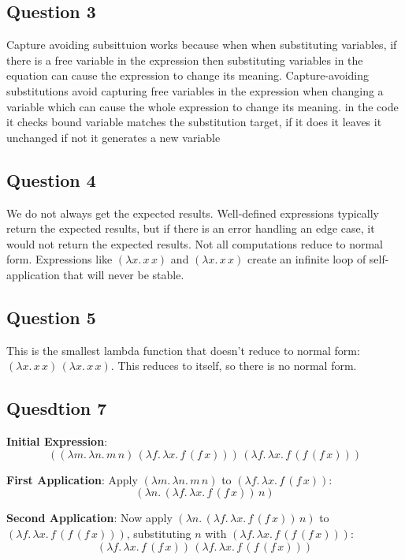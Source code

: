 \documentclass{article}
\theoremstyle{plain}
\theoremstyle{definition}
\theoremstyle{remark}
\begin{document}
\subsection{Question 3}

Capture avoiding subsittuion works because when when substituting variables, if there is a free variable in the expression then substituting variables in the equation can cause the expression to change its meaning. Capture-avoiding substitutions avoid capturing free variables in the expression when changing a variable which can cause the whole expression to change its meaning. in the code it checks bound variable matches the substitution target, if it does it leaves it unchanged if not it generates a new variable

\subsection{Question 4}

We do not always get the expected results. Well-defined expressions typically return the expected results, but if there is an error handling an edge case, it would not return the expected results. Not all computations reduce to normal form. Expressions like \((\lambda x. \, x \, x)\) and \((\lambda x. \, x \, x)\) create an infinite loop of self-application that will never be stable.

\subsection{Question 5}

This is the smallest lambda function that doesn’t reduce to normal form: \((\lambda x. \, x \, x) \, (\lambda x. \, x \, x)\). This reduces to itself, so there is no normal form.

\subsection{Quesdtion 7}

\textbf{Initial Expression}:
\[
((\lambda m.\, \lambda n.\, m \, n) \, (\lambda f.\, \lambda x.\, f \, (f \, x))) \, (\lambda f.\, \lambda x.\, f \, (f \, (f \, x)))
\]

\textbf{First Application}:
Apply \((\lambda m.\, \lambda n.\, m \, n)\) to \((\lambda f.\, \lambda x.\, f \, (f \, x))\):
\[
(\lambda n.\, (\lambda f.\, \lambda x.\, f \, (f \, x)) \, n)
\]

\textbf{Second Application}:
Now apply \((\lambda n.\, (\lambda f.\, \lambda x.\, f \, (f \, x)) \, n)\) to \((\lambda f.\, \lambda x.\, f \, (f \, (f \, x)))\), substituting \(n\) with \((\lambda f.\, \lambda x.\, f \, (f \, (f \, x)))\):
\[
(\lambda f.\, \lambda x.\, f \, (f \, x)) \, (\lambda f.\, \lambda x.\, f \, (f \, (f \, x)))
\]
\end{document}
